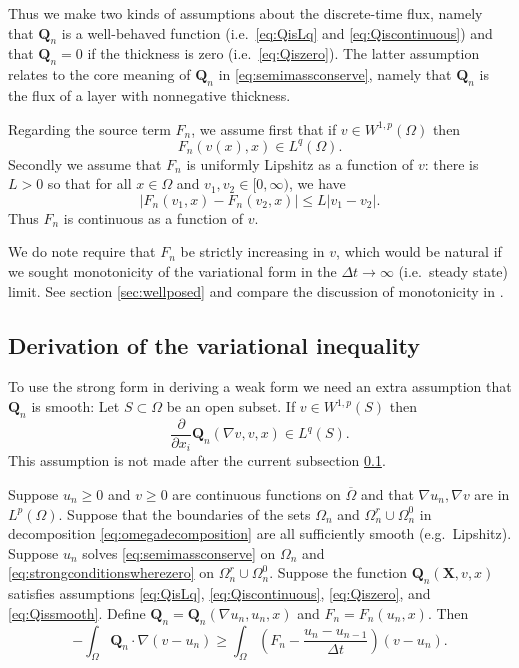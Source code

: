 \documentclass[final,leqno,onefignum,onetabnum]{siamltex1213bueler}
\newcommand\bQ{\mathbf{Q}}
\newcommand\bX{\mathbf{X}}
\renewcommand{\grad}{\nabla}
\begin{document}
Thus we make two kinds of assumptions about the discrete-time flux, namely that $\bQ_n$ is a well-behaved function (i.e.~\eqref{eq:QisLq} and \eqref{eq:Qiscontinuous}) and
that $\bQ_n=0$ if the thickness is zero (i.e.~\eqref{eq:Qiszero}).  The latter assumption relates to the core meaning of $\bQ_n$ in \eqref{eq:semimassconserve}, namely that $\bQ_n$ is the flux of a layer with nonnegative thickness.

Regarding the source term $F_n$, we assume first that if $v\in W^{1,p}(\Omega)$ then
\begin{equation}
F_n(v(x),x) \in L^q(\Omega).  \label{eq:FisLq}
\end{equation}
Secondly we assume that $F_n$ is uniformly Lipshitz as a function of $v$: there is $L>0$ so that for all $x\in\Omega$ and $v_1,v_2 \in [0,\infty)$, we have
\begin{equation}
\left|F_n(v_1,x)-F_n(v_2,x)\right| \le L |v_1-v_2|.  \label{eq:Fislip}
\end{equation}
Thus $F_n$ is continuous as a function of $v$.

We do note require that $F_n$ be strictly increasing in $v$, which would be natural if we sought monotonicity of the variational form in the $\Delta t \to \infty$ (i.e.~steady state) limit.  See section \ref{sec:wellposed} and compare the discussion of monotonicity in  \cite{JouvetBueler2012}.

\subsection{Derivation of the variational inequality}  \label{subsec:derivevi}  To use the strong form in deriving a weak form we need an extra assumption that $\bQ_n$ is smooth:  Let $S \subset \Omega$ be an open subset.  If $v\in W^{1,p}(S)$ then
\begin{equation}
\frac{\partial}{\partial x_i} \bQ_n(\grad v,v,x) \in L^q(S). \label{eq:Qissmooth}
\end{equation}
This assumption is not made after the current subsection \ref{subsec:derivevi}.

\medskip
\begin{theorem} \label{thm:strongimpliesweak} Suppose $u_n\ge 0$ and $v\ge 0$ are continuous functions on $\overline{\Omega}$ and that $\grad u_n,\grad v$ are in $L^p(\Omega)$.  Suppose that the boundaries of the sets $\Omega_n$ and $\Omega_n^r \cup \Omega_n^0$ in decomposition \eqref{eq:omegadecomposition} are all sufficiently smooth (e.g.~Lipshitz).  Suppose $u_n$ solves \eqref{eq:semimassconserve} on $\Omega_n$ and \eqref{eq:strongconditionswherezero} on $\Omega_n^r \cup \Omega_n^0$.  Suppose the function $\bQ_n(\bX,v,x)$ satisfies assumptions \eqref{eq:QisLq}, \eqref{eq:Qiscontinuous}, \eqref{eq:Qiszero}, and \eqref{eq:Qissmooth}.  Define $\bQ_n=\bQ_n(\grad u_n,u_n,x)$ and $F_n = F_n(u_n,x)$.  Then
\begin{equation}
-\int_{\Omega} \bQ_n \cdot \grad(v-u_n) \ge \int_{\Omega} \left(F_n - \frac{u_n - u_{n-1}}{\Delta t}\right) (v-u_n). \label{eq:morallytheVI}
\end{equation}
\end{theorem}
\end{document}
